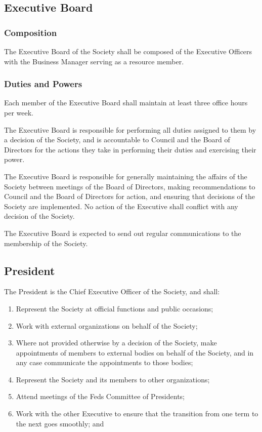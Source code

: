\subsection{Executive Board}

\subsubsection{Composition}
The Executive Board of the Society shall be composed of the Executive Officers
with the Business Manager serving as a resource member.

\subsubsection{Duties and Powers}
Each member of the Executive Board shall maintain at least three office hours
per week.

The Executive Board is responsible for performing all duties assigned to them
by a decision of the Society, and is accountable to Council and the
Board of Directors for the actions they take in performing their duties and
exercising their power.

The Executive Board is responsible for generally maintaining the affairs of the
Society between meetings of the Board of Directors, making recommendations to
Council and the Board of Directors for action, and ensuring that
decisions of the Society are implemented.  No action of the Executive shall
conflict with any decision of the Society.

The Executive Board is expected to send out regular communications to the
membership of the Society.

\subsection{President}
The President is the Chief Executive Officer of the Society, and shall:
\begin{enumerate}
  \item Represent the Society at official functions and public occasions;
  \item Work with external organizations on behalf of the Society;
  \item Where not provided otherwise by a decision of the Society, make
    appointments of members to external bodies on behalf of the Society, and in
    any case communicate the appointments to those bodies;
  \item Represent the Society and its members to other organizations;
  \item Attend meetings of the Feds Committee of Presidents;
  \item Work with the other Executive to ensure that the transition from one
    term to the next goes smoothly; and
\end{enumerate}

